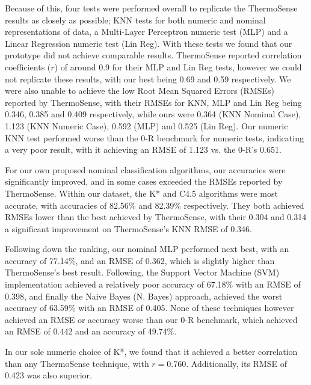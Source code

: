 \documentclass[../thesis/thesis.tex]{subfiles}
\begin{document}
Because of this, four tests were performed overall to replicate the ThermoSense results as closely as possible; KNN tests for both numeric and nominal representations of data, a Multi-Layer Perceptron numeric test (MLP) and a Linear Regression numeric test (Lin Reg). With these tests we found that our prototype did not achieve comparable results. ThermoSense reported correlation coefficients ($r$) of around 0.9 for their MLP and Lin Reg tests, however we could not replicate these results, with our best being 0.69 and 0.59 respectively. We were also unable to achieve the low Root Mean Squared Errors (RMSEs) reported by ThermoSense, with their RMSEs for KNN, MLP and Lin Reg being 0.346, 0.385 and 0.409 respectively, while ours were 0.364 (KNN Nominal Case), 1.123 (KNN Numeric Case), 0.592 (MLP) and 0.525 (Lin Reg). Our numeric KNN test performed worse than the 0-R benchmark for numeric tests, indicating a very poor result, with it achieving an RMSE of 1.123 vs. the 0-R's 0.651.

For our own proposed nominal classification algorithms, our accuracies were significantly improved, and in some cases exceeded the RMSEs reported by ThermoSense. Within our dataset, the K* and C4.5 algorithms were most accurate, with accuracies of 82.56\% and 82.39\% respectively. They both achieved RMSEs lower than the best achieved by ThermoSense, with their 0.304 and 0.314 a significant improvement on ThermoSense's KNN RMSE of 0.346.

Following down the ranking, our nominal MLP performed next best, with an accuracy of 77.14\%, and an RMSE of 0.362, which is slightly higher than ThermoSense's best result. Following, the Support Vector Machine (SVM) implementation achieved a relatively poor accuracy of 67.18\% with an RMSE of 0.398, and finally the Naive Bayes (N. Bayes) approach, achieved the worst accuracy of 63.59\% with an RMSE of 0.405. None of these techniques however achieved an RMSE or accuracy worse than our 0-R benchmark, which achieved an RMSE of 0.442 and an accuracy of 49.74\%.

In our sole numeric choice of K*, we found that it achieved a better correlation than any ThermoSense technique, with $r = 0.760$. Additionally, its RMSE of 0.423 was also superior.
\end{document}

